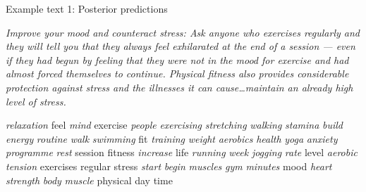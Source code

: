 \documentclass[10pt,ignorenonframetext,]{beamer}
\begin{document}
\begin{frame}{Example text 1: Posterior predictions}

	{\small\textit{
Improve your mood and counteract stress: Ask anyone who exercises regularly and
they will tell you that they always feel exhilarated at the end of a session —
even if they had begun by feeling that they were not in the mood for exercise
and had almost forced themselves to continue. Physical fitness also provides
considerable protection against stress and the illnesses it can cause\ldots maintain an already high level of stress.
    }}
    \begin{center}
{\fontsize{7.29}{30}\selectfont \textit{relaxation}}
{\fontsize{13.42}{30}\selectfont feel}
{\fontsize{9.62}{30}\selectfont \textit{mind}}
{\fontsize{29.68}{30}\selectfont exercise}
{\fontsize{10.34}{30}\selectfont \textit{people}}
{\fontsize{6.97}{30}\selectfont \textit{exercising}}
{\fontsize{7.55}{30}\selectfont \textit{stretching}}
{\fontsize{18.49}{30}\selectfont \textit{walking}}
{\fontsize{10.00}{30}\selectfont \textit{stamina}}
{\fontsize{7.45}{30}\selectfont \textit{build}}
{\fontsize{6.81}{30}\selectfont \textit{energy}}
{\fontsize{11.55}{30}\selectfont \textit{routine}}
{\fontsize{16.41}{30}\selectfont \textit{walk}}
{\fontsize{8.93}{30}\selectfont \textit{swimming}}
{\fontsize{14.17}{30}\selectfont fit}
{\fontsize{17.36}{30}\selectfont \textit{training}}
{\fontsize{9.10}{30}\selectfont \textit{weight}}
{\fontsize{7.32}{30}\selectfont \textit{aerobics}}
{\fontsize{14.26}{30}\selectfont \textit{health}}
{\fontsize{7.54}{30}\selectfont \textit{yoga}}
{\fontsize{6.66}{30}\selectfont \textit{anxiety}}
{\fontsize{10.48}{30}\selectfont \textit{programme}}
{\fontsize{7.89}{30}\selectfont \textit{rest}}
{\fontsize{7.01}{30}\selectfont session}
{\fontsize{19.44}{30}\selectfont fitness}
{\fontsize{8.89}{30}\selectfont \textit{increase}}
{\fontsize{8.78}{30}\selectfont life}
{\fontsize{8.73}{30}\selectfont \textit{running}}
{\fontsize{9.96}{30}\selectfont \textit{week}}
{\fontsize{8.44}{30}\selectfont \textit{jogging}}
{\fontsize{7.94}{30}\selectfont \textit{rate}}
{\fontsize{7.09}{30}\selectfont level}
{\fontsize{12.18}{30}\selectfont \textit{aerobic}}
{\fontsize{8.87}{30}\selectfont \textit{tension}}
{\fontsize{18.45}{30}\selectfont exercises}
{\fontsize{11.58}{30}\selectfont regular}
{\fontsize{14.47}{30}\selectfont stress}
{\fontsize{7.06}{30}\selectfont \textit{start}}
{\fontsize{7.04}{30}\selectfont \textit{begin}}
{\fontsize{17.27}{30}\selectfont \textit{muscles}}
{\fontsize{6.76}{30}\selectfont \textit{gym}}
{\fontsize{12.26}{30}\selectfont \textit{minutes}}
{\fontsize{11.16}{30}\selectfont mood}
{\fontsize{12.36}{30}\selectfont \textit{heart}}
{\fontsize{11.34}{30}\selectfont \textit{strength}}
{\fontsize{19.97}{30}\selectfont \textit{body}}
{\fontsize{12.18}{30}\selectfont \textit{muscle}}
{\fontsize{16.99}{30}\selectfont physical}
{\fontsize{13.20}{30}\selectfont day}
{\fontsize{17.37}{30}\selectfont time}
    \end{center}
\end{frame}
\end{document}
